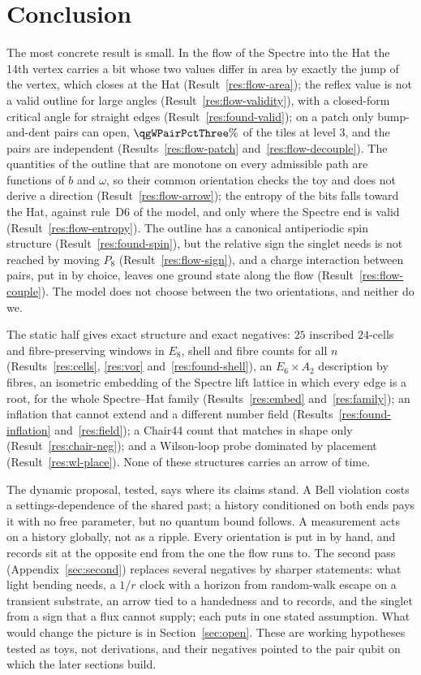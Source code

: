 \documentclass[11pt]{article}
\theoremstyle{definition}
\begin{document}
\section{Conclusion}
The most concrete result is small. In the flow of the Spectre into the Hat the 14th vertex carries a bit whose two values differ in area by exactly the jump of the vertex, which closes at the Hat (Result~\ref{res:flow-area}); the reflex value is not a valid outline for large angles (Result~\ref{res:flow-validity}), with a closed-form critical angle for straight edges (Result~\ref{res:found-valid}); on a patch only bump-and-dent pairs can open, $\qgWPairPctThree\%$ of the tiles at level $3$, and the pairs are independent (Results~\ref{res:flow-patch} and~\ref{res:flow-decouple}). The quantities of the outline that are monotone on every admissible path are functions of $b$ and $\omega$, so their common orientation checks the toy and does not derive a direction (Result~\ref{res:flow-arrow}); the entropy of the bits falls toward the Hat, against rule~D6 of the model, and only where the Spectre end is valid (Result~\ref{res:flow-entropy}). The outline has a canonical antiperiodic spin structure (Result~\ref{res:found-spin}), but the relative sign the singlet needs is not reached by moving $P_8$ (Result~\ref{res:flow-sign}), and a charge interaction between pairs, put in by choice, leaves one ground state along the flow (Result~\ref{res:flow-couple}). The model does not choose between the two orientations, and neither do we.

The static half gives exact structure and exact negatives: $25$ inscribed $24$-cells and fibre-preserving windows in $E_8$, shell and fibre counts for all $n$ (Results~\ref{res:cells}, \ref{res:vor} and~\ref{res:found-shell}), an $E_6\times A_2$ description by fibres, an isometric embedding of the Spectre lift lattice in which every edge is a root, for the whole Spectre--Hat family (Results~\ref{res:embed} and~\ref{res:family}); an inflation that cannot extend and a different number field (Results~\ref{res:found-inflation} and~\ref{res:field}); a Chair44 count that matches in shape only (Result~\ref{res:chair-neg}); and a Wilson-loop probe dominated by placement (Result~\ref{res:wl-place}). None of these structures carries an arrow of time.

The dynamic proposal, tested, says where its claims stand. A Bell violation costs a settings-dependence of the shared past; a history conditioned on both ends pays it with no free parameter, but no quantum bound follows. A measurement acts on a history globally, not as a ripple. Every orientation is put in by hand, and records sit at the opposite end from the one the flow runs to. The second pass (Appendix~\ref{sec:second}) replaces several negatives by sharper statements: what light bending needs, a $1/r$ clock with a horizon from random-walk escape on a transient substrate, an arrow tied to a handedness and to records, and the singlet from a sign that a flux cannot supply; each puts in one stated assumption. What would change the picture is in Section~\ref{sec:open}. These are working hypotheses tested as toys, not derivations, and their negatives pointed to the pair qubit on which the later sections build.
\end{document}
